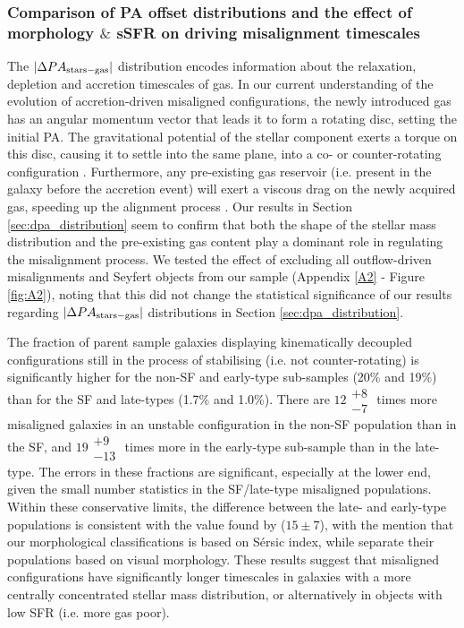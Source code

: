 \documentclass[fleqn,usenatbib]{mnras}
\begin{document}
\subsubsection{Comparison of PA offset
distributions and the effect of morphology $\&$ sSFR on driving misalignment timescales}
\label{sec:discuss_misalignment_dPA_timescales}
The $|\Delta PA_{\rm{stars-gas}}|$ distribution encodes information about the relaxation, depletion and accretion timescales of gas. In our current understanding of the evolution of accretion-driven misaligned configurations, the newly introduced gas has an angular momentum vector that leads it to form a rotating disc, setting the initial PA. The gravitational potential of the stellar component exerts a torque on this disc, causing it to settle into the same plane, into a co- or counter-rotating configuration \citep*{Tohline1982}. Furthermore, any pre-existing gas reservoir (i.e. present in the galaxy before the accretion event) will exert a viscous drag on the newly acquired gas, speeding up the alignment process \citep{Davis2011}. Our results in Section \ref{sec:dpa_distribution} seem to confirm that both the shape of the stellar mass distribution and the pre-existing gas content play a dominant role in regulating the misalignment process. We tested the effect of excluding all outflow-driven misalignments and Seyfert objects from our sample (Appendix \ref{A2} - Figure \ref{fig:A2}), noting that this did not change the statistical significance of our results regarding $|\Delta PA_{\rm{stars-gas}}|$ distributions in Section \ref{sec:dpa_distribution}.

The fraction of parent sample galaxies displaying kinematically decoupled configurations still in the process of stabilising (i.e. not counter-rotating) is significantly higher for the non-SF and early-type sub-samples (20\% and 19\%) than for the SF and late-types (1.7\% and 1.0\%). There are $ 12 \substack{+8 \\ -7}$ times more misaligned galaxies in an unstable configuration in the non-SF population than in the SF, and $ 19 \substack{+9 \\ -13}$ times more in the early-type sub-sample than in the late-type. The errors in these fractions are significant, especially at the lower end, given the small number statistics in the SF/late-type  misaligned populations. Within these conservative limits, the difference between the late- and early-type populations is consistent with the value found by \cite{Bryant2019} ($15\pm 7$), with the mention that our morphological classifications is based on S\'ersic index, while \cite{Bryant2019} separate their populations based on visual morphology. These results suggest that misaligned configurations have significantly longer timescales in galaxies with a more centrally concentrated stellar mass distribution, or alternatively in objects with low SFR (i.e. more gas poor).
\end{document}
